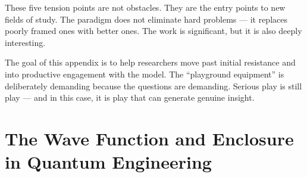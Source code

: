 These five tension points are not obstacles. They are the entry points to new fields of study. The paradigm does not eliminate hard problems — it replaces poorly framed ones with better ones. The work is significant, but it is also deeply interesting.

The goal of this appendix is to help researchers move past initial resistance and into productive engagement with the model. The “playground equipment” is deliberately demanding because the questions are demanding. Serious play is still play — and in this case, it is play that can generate genuine insight.

\chapter{The Wave Function and Enclosure in Quantum Engineering}

